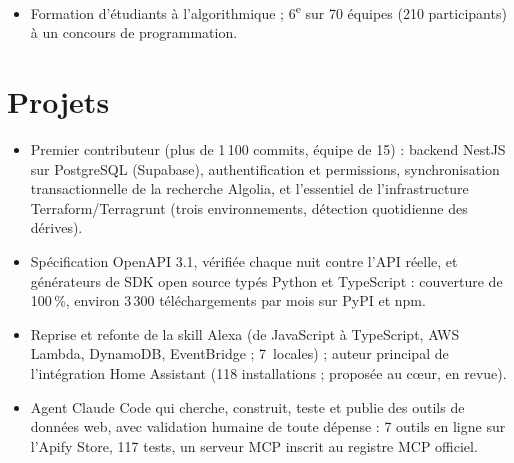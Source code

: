 \documentclass[a4paper,10pt]{article}
\begin{document}
\begin{itemize}
  \item Formation d'étudiants à l'algorithmique ; 6\textsuperscript{e} sur 70 équipes (210 participants) à un concours de programmation.
\end{itemize}

\section{Projets}

\begin{itemize}
  \item Premier contributeur (plus de 1\,100 commits, équipe de 15) : backend NestJS sur PostgreSQL (Supabase),
        authentification et permissions, synchronisation transactionnelle de la recherche Algolia, et l'essentiel de
        l'infrastructure Terraform/Terragrunt (trois environnements, détection quotidienne des dérives).
\end{itemize}
\entrygap

\begin{itemize}
  \item Spécification OpenAPI 3.1, vérifiée chaque nuit contre l'API réelle, et générateurs de SDK open source typés
        Python et TypeScript : couverture de 100\,\%, environ 3\,300 téléchargements par mois sur PyPI et npm.
  \item Reprise et refonte de la skill Alexa (de JavaScript à TypeScript, AWS Lambda, DynamoDB, EventBridge ; 7~locales) ;
        auteur principal de l'intégration Home Assistant (118 installations ; proposée au cœur, en revue).
\end{itemize}
\entrygap

\begin{itemize}
  \item Agent Claude Code qui cherche, construit, teste et publie des outils de données web, avec validation humaine de
        toute dépense : 7 outils en ligne sur l'Apify Store, 117 tests, un serveur MCP inscrit au registre MCP officiel.
\end{itemize}
\end{document}
